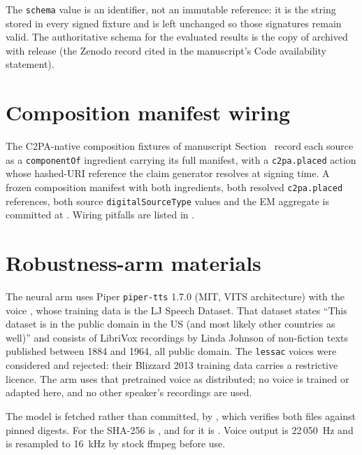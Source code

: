 \documentclass[11pt]{article}
\begin{document}
The \texttt{schema} value is an identifier, not an immutable reference: it is the
string stored in every signed fixture and is left unchanged so those signatures
remain valid. The authoritative schema for the evaluated results is the copy of
 archived with release \Rtag{} (the Zenodo
record cited in the manuscript's Code availability statement).

\section{Composition manifest wiring}
\label{s:composition}

The C2PA-native composition fixtures of manuscript Section~\SecComposition{}
record each source as a \texttt{componentOf} ingredient carrying its full
manifest, with a \texttt{c2pa.placed} action whose hashed-URI reference the
claim generator resolves at signing time. A frozen composition manifest with
both ingredients, both resolved \texttt{c2pa.placed} references, both source
\texttt{digitalSourceType} values and the EM aggregate is committed at
. Wiring pitfalls
are listed in .

\section{Robustness-arm materials}
\label{s:robustness}

The neural arm uses Piper \texttt{piper-tts} 1.7.0 (MIT, VITS architecture)
with the voice , whose training data is the LJ
Speech Dataset. That dataset states ``This dataset is in the public domain in
the US (and most likely other countries as well)'' and consists of LibriVox
recordings by Linda Johnson of non-fiction texts published between 1884 and
1964, all public domain. The \texttt{lessac} voices were considered and
rejected: their Blizzard 2013 training data carries a restrictive licence. The
arm uses that pretrained voice as distributed; no voice is trained or adapted
here, and no other speaker's recordings are used.

\begingroup
The model is fetched rather than committed, by ,
which verifies both files against pinned digests. For
 the SHA-256 is
, and
for  it is
.
Voice output is 22\,050~Hz and is resampled to 16~kHz by stock ffmpeg before
use.
\par\endgroup
\end{document}
